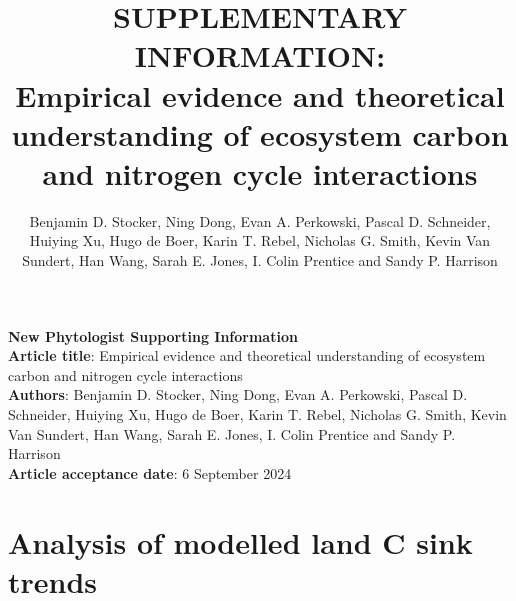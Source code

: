 \documentclass{myreport}
\begin{document}
\pagestyle{headings}

\renewcommand{\thefigure}{\arabic{figure}}
\renewcommand{\thetable}{\arabic{table}}
\renewcommand{\thesection}{Notes S\arabic{section}}
\renewcommand{\theequation}{\arabic{equation}}

% 

\title{SUPPLEMENTARY INFORMATION:\\
Empirical evidence and theoretical understanding of ecosystem carbon and nitrogen cycle interactions}
\author{Benjamin D. Stocker, Ning Dong, Evan A. Perkowski, Pascal D. Schneider,
Huiying Xu, Hugo de Boer, Karin T. Rebel, Nicholas G. Smith, Kevin Van Sundert, Han Wang, Sarah E. Jones, I. Colin Prentice and Sandy P. Harrison} 


{\selectfont
\noindent \textbf{New Phytologist Supporting Information} \\
\textbf{Article title}: Empirical evidence and theoretical understanding of ecosystem carbon and nitrogen cycle interactions\\
\textbf{Authors}: Benjamin D. Stocker, Ning Dong, Evan A. Perkowski, Pascal D. Schneider,
Huiying Xu, Hugo de Boer, Karin T. Rebel, Nicholas G. Smith, Kevin Van Sundert, Han Wang, Sarah E. Jones, I. Colin Prentice and Sandy P. Harrison\\
\textbf{Article acceptance date}: 6 September 2024 \\
}

\section{Analysis of modelled land C sink trends}
\end{document}
